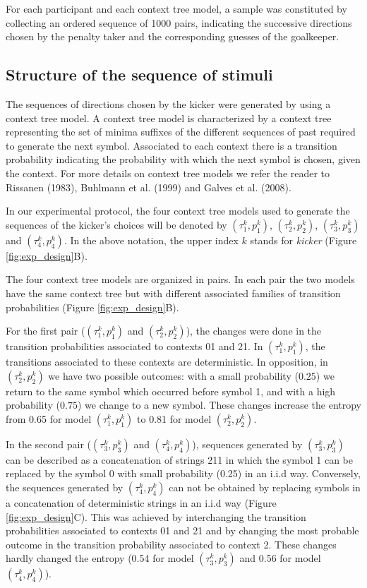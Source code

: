 \documentclass[fleqn,10pt]{wlscirep}
\begin{document}
For each participant and each context tree model, a sample was constituted by collecting an ordered sequence of 1000 pairs, indicating the successive directions chosen by the penalty taker and the corresponding guesses of the goalkeeper. 

\subsection*{Structure of the sequence of stimuli}

The sequences of directions chosen by the kicker were generated by using a context tree model. A context tree model is characterized by a context tree representing the set of minima suffixes of the different sequences of past required to generate the next symbol. Associated to each context there is a transition probability indicating the probability with which the next symbol is chosen, given the context. For more details on context tree models we refer the reader to Rissanen (1983)\cite{Rissanen:83}, Buhlmann et al. (1999) \cite{Buhlmann-Wyner:99} and Galves et al. (2008)\cite{Galves-Loch:08}. 

In our experimental protocol, the four context tree models used to generate the sequences of the kicker's choices will be denoted by $(\tau^k_1, p^k_1)$, $(\tau^k_2, p^k_2)$, $(\tau^k_3, p^k_3)$ and $(\tau^k_4, p^k_4)$. In the above notation, the upper index $k$ stands for \textit{kicker} (Figure \ref{fig:exp_design}B).

The four context tree models are organized in pairs. In each pair the two models have the same context tree but with different associated families of transition probabilities (Figure \ref{fig:exp_design}B).

For the first pair ($(\tau^k_1, p^k_1)$ and $(\tau^k_2, p^k_2)$), the changes were done in the transition probabilities associated to contexts 01 and 21. In $(\tau^k_1, p^k_1)$, the transitions associated to these contexts are deterministic. In opposition, in $(\tau^k_2, p^k_2)$ we have two possible outcomes: with a small probability ($0.25$) we return to the same symbol which occurred before symbol 1, and with a high probability ($0.75$) we change to a new symbol. These changes increase the entropy from 0.65 for model $(\tau^k_1, p^k_1)$ to 0.81 for model $(\tau^k_2, p^k_2)$.   

In the second pair ($(\tau^k_3, p^k_3)$ and $(\tau^k_4, p^k_4)$), sequences generated by $(\tau^k_3, p^k_3)$ can be described as a concatenation of strings 211 in which the symbol 1 can be replaced by the symbol 0 with small probability (0.25) in an i.i.d way. Conversely, the sequences generated by $(\tau^k_4, p^k_4)$ can not be obtained by replacing symbols in a concatenation of deterministic strings in an i.i.d way (Figure \ref{fig:exp_design}C). This was achieved by interchanging the transition probabilities associated to contexts 01 and 21 and by changing the most probable outcome in the transition probability associated to context 2. These changes hardly changed the entropy (0.54 for model $(\tau^k_3, p^k_3)$ and 0.56 for model $(\tau^k_4, p^k_4)$).
\end{document}
